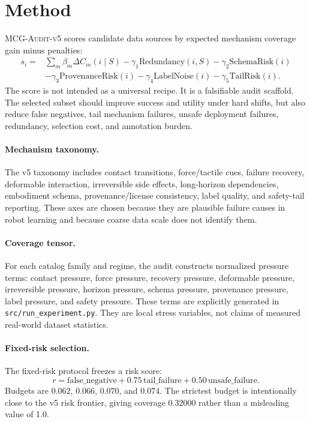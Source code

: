 \documentclass{article}
\newcommand{\method}{\textsc{MCG-Audit-v5}}
\begin{document}
\section{Method}
\method{} scores candidate data sources by expected mechanism coverage gain minus penalties:
\[
  \begin{aligned}
  s_i =& \sum_m \beta_m \Delta C_m(i\mid S)
  - \gamma_1 \mathrm{Redundancy}(i,S)-\gamma_2 \mathrm{SchemaRisk}(i)\\
  &-\gamma_3 \mathrm{ProvenanceRisk}(i)-\gamma_4 \mathrm{LabelNoise}(i)
  -\gamma_5 \mathrm{TailRisk}(i).
  \end{aligned}
\]
The score is not intended as a universal recipe. It is a falsifiable audit scaffold. The selected subset should improve success and utility under hard shifts, but also reduce false negatives, tail mechanism failures, unsafe deployment failures, redundancy, selection cost, and annotation burden.

\paragraph{Mechanism taxonomy.}
The v5 taxonomy includes contact transitions, force/tactile cues, failure recovery, deformable interaction, irreversible side effects, long-horizon dependencies, embodiment schema, provenance/license consistency, label quality, and safety-tail reporting. These axes are chosen because they are plausible failure causes in robot learning and because coarse data scale does not identify them.

\paragraph{Coverage tensor.}
For each catalog family and regime, the audit constructs normalized pressure terms: contact pressure, force pressure, recovery pressure, deformable pressure, irreversible pressure, horizon pressure, schema pressure, provenance pressure, label pressure, and safety pressure. These terms are explicitly generated in \texttt{src/run\_experiment.py}. They are local stress variables, not claims of measured real-world dataset statistics.

\paragraph{Fixed-risk selection.}
The fixed-risk protocol freezes a risk score:
\[
  r=\mathrm{false\_negative}+0.75\,\mathrm{tail\_failure}+0.50\,\mathrm{unsafe\_failure}.
\]
Budgets are $0.062$, $0.066$, $0.070$, and $0.074$. The strictest budget is intentionally close to the v5 risk frontier, giving coverage 0.32000 rather than a misleading value of 1.0.
\end{document}
